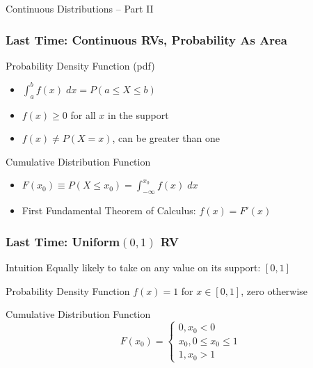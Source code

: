 \documentclass[handout]{beamer}
\date{Lecture \# 9}
\begin{document}
 


\begin{frame}[plain]
	\titlepage 
	

\end{frame} 


\begin{frame}
\begin{center}
\Huge Continuous Distributions -- Part II
\end{center}
\end{frame}


\begin{frame}
\frametitle{Last Time: Continuous RVs,  Probability As Area}
\begin{block}{Probability Density Function (pdf)}
	\begin{itemize}
		\item $\int_a^b f(x) \; dx = P(a \leq X \leq b)$
		\item $f(x) \geq 0$ for all $x$ in the support
		\item $f(x) \neq P(X=x)$, can be greater than one
	\end{itemize}
\end{block}

\begin{block}{Cumulative Distribution Function}
	\begin{itemize}
		\item $F(x_0) \equiv P(X\leq x_0) =  \int_{-\infty}^{x_0} f(x) \; dx$
		\item First Fundamental Theorem of Calculus: $f(x) = F'(x)$ 
	\end{itemize}
\end{block}


\end{frame}
\begin{frame}
\frametitle{Last Time: Uniform$(0,1)$ RV}
\begin{block}{Intuition}
Equally likely to take on any value on its support: $[0,1]$
\end{block}
\begin{block}{Probability Density Function}
	$f(x) = 1$ for $x \in [0,1]$, zero otherwise
\end{block}
\begin{block}{Cumulative Distribution Function}
	$$ F(x_0) = \left\{ \begin{array}{c} 0, x_0 < 0\\ x_0, 0\leq x_0 \leq 1\\ 1, x_0 > 1   \end{array}\right.$$
\end{block}
\end{frame}
\end{document}
